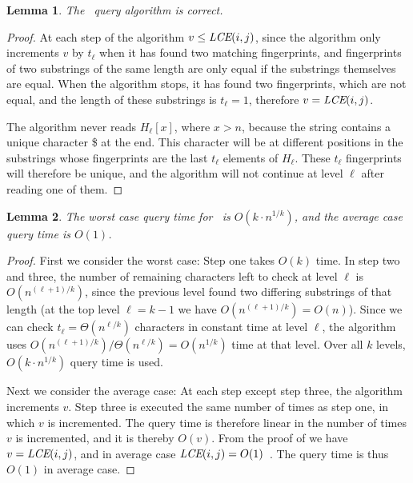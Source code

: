 \documentclass[a4]{article}
\newcommand*{\pref}{\prettyref}
\newtheorem{lemma}{Lemma}
\begin{document}
\begin{lemma}\label{lem:query-correct}
The \fprintk\ query algorithm is correct.
\end{lemma}
\begin{proof}
At each step of the algorithm $v \leq \textit{LCE}(i,j)$, since the algorithm only increments $v$ by $t_\ell$ when it has found two matching fingerprints, and fingerprints of two substrings of the same length are only equal if the substrings themselves are equal. When the algorithm stops, it has found two fingerprints, which are not equal, and the length of these substrings is $t_\ell = 1$, therefore $v = \textit{LCE}(i,j)$.

The algorithm never reads $H_\ell[x]$, where $x>n$, because the string contains a unique character \$ at the end. This character will be at different positions in the substrings whose fingerprints are the last $t_\ell$ elements of $H_\ell$. These $t_\ell$ fingerprints will therefore be unique, and the algorithm will not continue at level $\ell$ after reading one of them.
\end{proof}

\begin{lemma}
The worst case query time for \fprintk\ is $O(k\cdot n^{1/k})$, and the average case query time is $O(1)$.
\end{lemma}
\begin{proof}
First we consider the worst case: Step one takes $O(k)$ time. In step two and three, the number of remaining characters left to check at level $\ell$ is $O(n^{(\ell+1)/k})$, since the previous level found two differing substrings of that length (at the top level $\ell=k-1$ we have $O(n^{(\ell+1)/k}) = O(n)$). Since we can check $t_\ell = \Theta(n^{\ell/k})$ characters in constant time at level $\ell$, the algorithm uses $O(n^{(\ell+1)/k})/\Theta(n^{\ell/k}) = O(n^{1/k})$ time at that level. Over all $k$ levels, $O(k\cdot n^{1/k})$ query time is used.

Next we consider the average case: At each step except step three, the algorithm increments $v$. Step three is executed the same number of times as step one, in which $v$ is incremented. The query time is therefore linear in the number of times $v$ is incremented, and it is thereby $O(v)$. From the proof of \pref{lem:query-correct} we have $v=\textit{LCE}(i,j)$, and in average case $\textit{LCE}(i,j)=O(1)$~\cite{ilie-navarro-tinta}. The query time is thus $O(1)$ in average case.
\end{proof}

\end{document}
